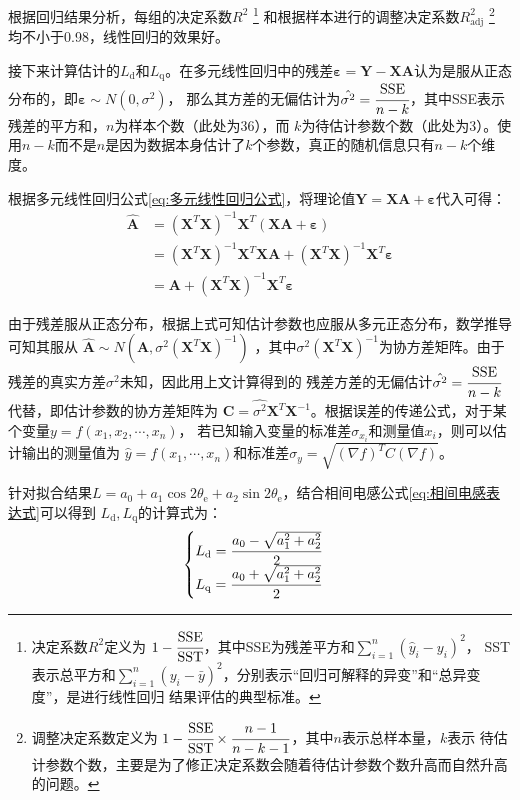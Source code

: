 根据回归结果分析，每组的决定系数\(R^2\)
\footnote{决定系数\(R^2\)定义为 \(1-\cfrac{\mathrm{SSE}}{\mathrm{SST}}\)，其中SSE为残差平方和\(\sum\limits_{i=1}^n(\hat{y}_{i}-y_i)^2\)，
SST表示总平方和\(\sum\limits_{i=1}^n(y_i-\bar{y})^2\)，分别表示“回归可解释的异变”和“总异变度”，是进行线性回归
结果评估的典型标准。}
和根据样本进行的调整决定系数\(R^2_{\mathrm{adj}}\)
\footnote{调整决定系数定义为 \(1-\cfrac{\mathrm{SSE}}{\mathrm{SST}}\times\cfrac{n-1}{n-k-1}\)，其中\(n\)表示总样本量，\(k\)表示
待估计参数个数，主要是为了修正决定系数会随着待估计参数个数升高而自然升高的问题。}
均不小于0.98，线性回归的效果好。

接下来计算估计的\(L_{\mathrm{d}}\)和\(L_{\mathrm{q}}\)。在多元线性回归中的残差\(\bm{\varepsilon} = \bm{Y} - \bm{X}\bm{A}\)认为是服从正态分布的，即\(\bm{\varepsilon}\sim N(0,\sigma^2)\)，
那么其方差的无偏估计为\(\hat{\sigma^2} = \cfrac{\mathrm{SSE}}{n-k}\)，其中SSE表示残差的平方和，\(n\)为样本个数（此处为36），而
\(k\)为待估计参数个数（此处为3）。使用\(n-k\)而不是\(n\)是因为数据本身估计了\(k\)个参数，真正的随机信息只有\(n-k\)个维度。

根据多元线性回归公式\eqref{eq:多元线性回归公式}，将理论值\(\bm{Y}=\bm{X}\bm{A}+\bm{\varepsilon}\)代入可得：
\begin{equation*}
    \begin{aligned}
        \hat{\bm{A}} &= (\bm{X}^T\bm{X})^{-1}\bm{X}^T(\bm{X}\bm{A}+\bm{\varepsilon})\\
        &=(\bm{X}^T\bm{X})^{-1}\bm{X}^T\bm{X}\bm{A}+(\bm{X}^T\bm{X})^{-1}\bm{X}^T\bm{\varepsilon}\\
        &=\bm{A}+(\bm{X}^T\bm{X})^{-1}\bm{X}^T\bm{\varepsilon}
    \end{aligned}
\end{equation*}

由于残差服从正态分布，根据上式可知估计参数也应服从多元正态分布，数学推导可知其服从
\(\hat{\bm{A}}\sim N(\bm{A},\sigma^2(\bm{X}^T\bm{X})^{-1})\)
，其中\(\sigma^2(\bm{X}^T\bm{X})^{-1}\)为协方差矩阵。由于残差的真实方差\(\sigma^2\)未知，因此用上文计算得到的
残差方差的无偏估计\(\hat{\sigma^2} = \cfrac{\mathrm{SSE}}{n-k}\)代替，即估计参数的协方差矩阵为
\(\bm{C} = \hat{\sigma^2}\bm{X}^T\bm{X}^{-1}\)。根据误差的传递公式，对于某个变量\(y=f(x_{1},x_{2},\cdots,x_{n})\)，
若已知输入变量的标准差\(\sigma_{x_i}\)和测量值\(x_i\)，则可以估计输出的测量值为
\(\hat{y}=f(x_{1},\cdots,x_{n})\)和标准差\(\sigma_{y}=\sqrt{(\nabla f)^T C (\nabla f)}\)。

针对拟合结果\(L=a_{0}+a_{1}\cos2\theta_{\mathrm{e}}+a_{2}\sin2\theta_{\mathrm{e}}\)，结合相间电感公式\eqref{eq:相间电感表达式}可以得到
\(L_{\mathrm{d}},L_{\mathrm{q}}\)的计算式为：
\begin{equation*}
    \begin{cases}
        L_{\mathrm{d}} =\cfrac{a_{0}-\sqrt{a_{1}^2+a_{2}^2}}{2}\\
        L_{\mathrm{q}} =\cfrac{a_{0}+\sqrt{a_{1}^2+a_{2}^2}}{2}
    \end{cases}
\end{equation*}

